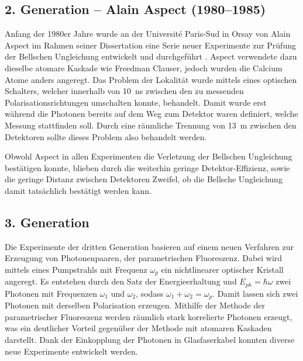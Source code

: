 \begin{refsection}
\subsection{2. Generation -- Alain Aspect (1980--1985)}
Anfang der 1980er Jahre wurde an der Universit\'e Paris-Sud in Orsay von Alain
Aspect im Rahmen seiner Dissertation eine Serie neuer Experimente zur Pr\"ufung
der Bellschen Ungleichung entwickelt und durchgef\"uhrt
\cite{Bell:Aspect1981,Bell:Aspect1982:1,Bell:Aspect1982:2}. 
Aspect verwendete dazu dieselbe atomare Kaskade wie Freedman Clauser, jedoch
wurden die Calcium Atome anders angeregt. 
Das Problem der Lokalit\"at wurde mittels eines optischen Schalters, welcher 
innerhalb von \SI{10}{\nano\second} zwischen den zu messenden 
Polarisationsrichtungen umschalten konnte, behandelt.
Damit wurde erst w\"ahrend die Photonen bereits auf dem Weg zum Detektor waren
definiert, welche Messung stattfinden soll.
Durch eine r\"aumliche Trennung von \SI{13}{\meter} zwischen den Detektoren
sollte dieses Problem also behandelt werden. 

Obwohl Aspect in allen Experimenten die Verletzung der Bellschen Ungleichung
best\"atigen konnte, blieben durch die weiterhin geringe Detektor-Effizienz,
sowie die geringe Distanz zwischen Detektoren Zweifel, ob die Bellsche
Ungleichung damit tats\"achlich best\"atigt werden kann.

\subsection{3. Generation}
Die Experimente der dritten Generation basieren auf einem neuen Verfahren
zur Erzeugung von Photonenpaaren, der parametrischen Fluoreszenz.
Dabei wird mittels eines Pumpstrahls mit Frequenz $\omega_p$ ein
nichtlinearer optischer Kristall angeregt.
Es entstehen durch den Satz der Energieerhaltung und $E_{ph}=\hbar \omega$
zwei Photonen mit Frequenzen $\omega_1$ und $\omega_2$, sodass 
$\omega_1 + \omega_2 = \omega_p$.
Damit lassen sich zwei Photonen mit derselben Polarisation erzeugen.
Mithilfe der Methode der parametrischer Fluoreszenz werden r\"aumlich
stark korrelierte Photonen erzeugt, was ein deutlicher Vorteil
gegen\"uber der Methode mit atomaren Kaskaden darstellt.
Dank der Einkopplung der Photonen in Glasfaserkabel konnten diverse neue
Experimente entwickelt werden.


\end{refsection}
